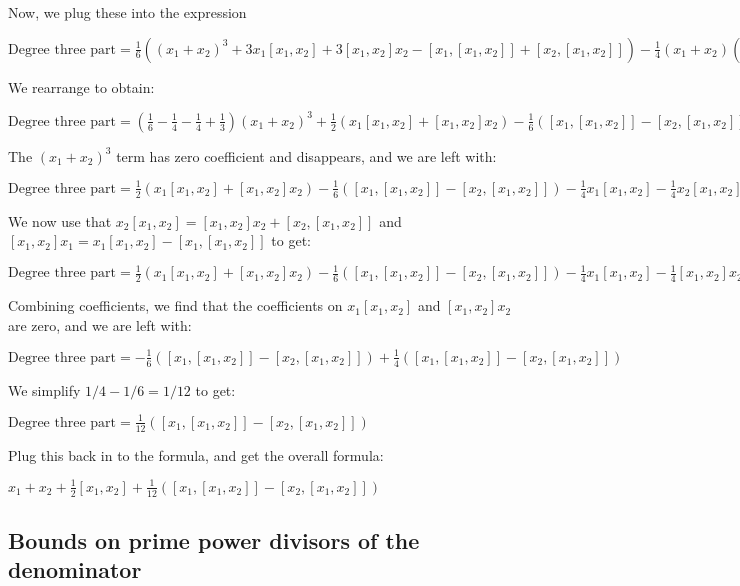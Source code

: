 \documentclass{ucetd}
\begin{document}
Now, we plug these into the expression 

$\mbox{Degree three part} = \frac{1}{6}((x_1 + x_2)^3 + 3x_1[x_1,x_2] + 3[x_1,x_2]x_2 - [x_1,[x_1,x_2]] + [x_2,[x_1,x_2]]) - \frac{1}{4}(x_1 + x_2)((x_1 + x_2)^2 + [x_1,x_2]) - \frac{1}{4}((x_1 + x_2)^2 + [x_1,x_2])(x_1 + x_2) + \frac{1}{3}(x_1 + x_2)^3$

We rearrange to obtain:

$\mbox{Degree three part} = \left(\frac{1}{6} - \frac{1}{4} - \frac{1}{4} + \frac{1}{3}\right)(x_1 + x_2)^3 + \frac{1}{2}(x_1[x_1,x_2] + [x_1,x_2]x_2) - \frac{1}{6}([x_1,[x_1,x_2]] - [x_2,[x_1,x_2]]) - \frac{1}{4}(x_1 + x_2)[x_1,x_2] - \frac{1}{4}([x_1,x_2](x_1 + x_2))$

The $(x_1 + x_2)^3$ term has zero coefficient and disappears, and we are left with:

$\mbox{Degree three part} = \frac{1}{2}(x_1[x_1,x_2] + [x_1,x_2]x_2) - \frac{1}{6}([x_1,[x_1,x_2]] - [x_2,[x_1,x_2]]) - \frac{1}{4}x_1[x_1,x_2] - \frac{1}{4}x_2[x_1,x_2] - \frac{1}{4}[x_1,x_2]x_1 - \frac{1}{4}[x_1,x_2]x_2$

We now use that $x_2[x_1,x_2] = [x_1,x_2]x_2 + [x_2,[x_1,x_2]]$ and $[x_1,x_2]x_1 = x_1[x_1,x_2] - [x_1,[x_1,x_2]]$ to get:

$\mbox{Degree three part} = \frac{1}{2}(x_1[x_1,x_2] + [x_1,x_2]x_2) - \frac{1}{6}([x_1,[x_1,x_2]] - [x_2,[x_1,x_2]]) - \frac{1}{4}x_1[x_1,x_2] - \frac{1}{4}[x_1,x_2]x_2 - \frac{1}{4}[x_2,[x_1,x_2]] - \frac{1}{4}x_1[x_1,x_2] + \frac{1}{4}[x_1,[x_1,x_2]] - \frac{1}{4}[x_1,x_2]x_2$

Combining coefficients, we find that the coefficients on $x_1[x_1,x_2]$ and $[x_1,x_2]x_2$ are zero, and we are left with:

$\mbox{Degree three part} = - \frac{1}{6}([x_1,[x_1,x_2]] - [x_2,[x_1,x_2]]) + \frac{1}{4}([x_1,[x_1,x_2]] - [x_2,[x_1,x_2]])$

We simplify $1/4 - 1/6 = 1/12$ to get:

$\mbox{Degree three part} = \frac{1}{12}([x_1,[x_1,x_2]] - [x_2,[x_1,x_2]])$

Plug this back in to the formula, and get the overall formula:

$x_1 + x_2 + \frac{1}{2}[x_1,x_2] + \frac{1}{12}([x_1,[x_1,x_2]] - [x_2,[x_1,x_2]])$

\subsection{Bounds on prime power divisors of the denominator}\label{appsec:bch-prime-power-divisor-bound}
\end{document}
